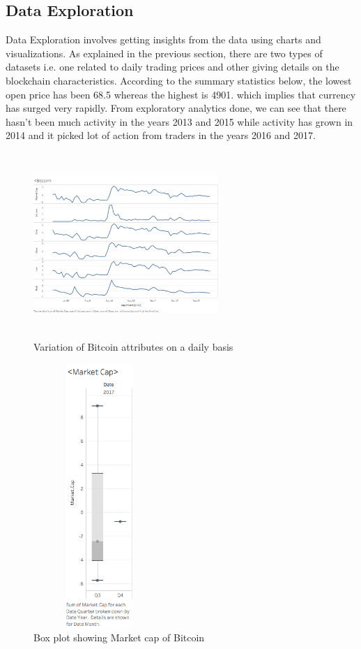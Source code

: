 \documentclass{article}
\begin{document}
\subsection{Data Exploration}
Data Exploration involves getting insights from the data using charts and visualizations. As explained in the previous section, there are two types of
datasets i.e. one related to daily trading prices and other giving details on the blockchain characteristics. According to the summary statistics below, the lowest open price has been 68.5 whereas the highest is 4901. which implies that currency has surged very rapidly. From exploratory analytics done, we can see that there hasn’t been much activity in the years 2013 and 2015 while activity has grown in 2014 and it picked lot of action from traders in the years 2016 and 2017.
\begin{figure}

    \centering
    \includegraphics[width = 7cm,height=7cm]{Sheet1.png}
    \caption{Variation of Bitcoin attributes on a daily basis}
    \label{fig:my_label}
    
\end{figure}

\begin{figure}

    \centering
    \includegraphics[width = 5cm,height=10cm]{Sheet2.png}
    \caption{Box plot showing Market cap of Bitcoin }
    \label{fig:my_label}
    
\end{figure}
\end{document}

